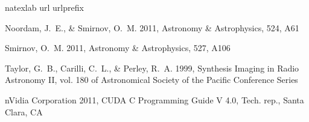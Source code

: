 \documentclass[11pt,twoside]{article}
\begin{document}
\begin{thebibliography}{}
\expandafter\ifx\csname natexlab\endcsname\relax\def\natexlab#1{#1}\fi
\expandafter\ifx\csname url\endcsname\relax
  \def\url#1{\texttt{#1}}\fi
\expandafter\ifx\csname urlprefix\endcsname\relax\def\urlprefix{URL }\fi
\providecommand{\eprint}[2][]{\url{#2}}

Noordam, J.~E., \& Smirnov, O.~M. 2011, Astronomy \& Astrophysics, 524, A61

Smirnov, O.~M. 2011, Astronomy \& Astrophysics, 527, A106

Taylor, G.~B., Carilli, C.~L., \& Perley, R.~A. 1999, {Synthesis Imaging in
  Radio Astronomy II}, vol. 180 of Astronomical Society of the Pacific
  Conference Series

nVidia Corporation 2011, {CUDA C Programming Guide V 4.0}, Tech.
  rep., Santa Clara, CA

\end{thebibliography}
\end{document}
